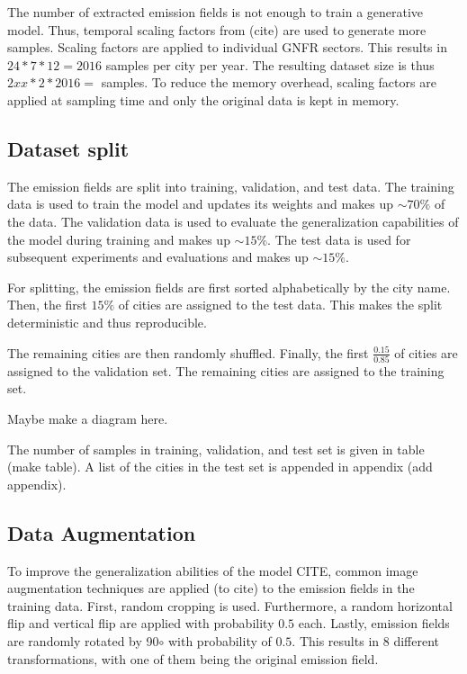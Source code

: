 The number of extracted emission fields is not enough to train a generative model.
Thus, temporal scaling factors from (cite) are used to generate more samples.
Scaling factors are applied to individual GNFR sectors.
This results in $24 * 7 * 12 = 2016$ samples per city per year.
The resulting dataset size is thus $2xx * 2 * 2016 = $ samples.
To reduce the memory overhead, scaling factors are applied at sampling time and only the original data is kept in memory.

\subsection{Dataset split}
The emission fields are split into training, validation, and test data.
The training data is used to train the model and updates its weights and makes up $\sim  70\%$ of the data.
The validation data is used to evaluate the generalization capabilities of the model during training and makes up $\sim  15\%$.
The test data is used for subsequent experiments and evaluations and makes up $\sim  15\%$.

For splitting, the emission fields are first sorted alphabetically by the city name.
Then, the first $15\%$ of cities are assigned to the test data.
This makes the split deterministic and thus reproducible.

The remaining cities are then randomly shuffled.
Finally, the first $\frac{0.15}{0.85}$ of cities are assigned to the validation set.
The remaining cities are assigned to the training set.

Maybe make a diagram here.

The number of samples in training, validation, and test set is given in table (make table).
A list of the cities in the test set is appended in appendix (add appendix).

\subsection{Data Augmentation}
To improve the generalization abilities of the model CITE, common image augmentation techniques are applied (to cite) to the emission fields in the training data.
First, random cropping is used.
Furthermore, a random horizontal flip and vertical flip are applied with probability $0.5$ each.
Lastly, emission fields are randomly rotated by 90$\circ$ with probability of $0.5$.
This results in $8$ different transformations, with one of them being the original emission field.

